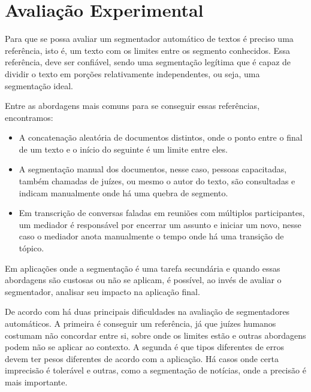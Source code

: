 
\section{Avaliação Experimental}
	\label{sec:avaliacao-experimental}

Para que se possa avaliar um segmentador automático de textos é preciso uma referência, isto é, um texto com os limites entre os segmento conhecidos. Essa referência, deve ser confiável, sendo uma segmentação legítima que é capaz de dividir o texto em porções relativamente independentes, ou seja, uma segmentação ideal.



Entre as abordagens mais comuns para se conseguir essas referências, encontramos: 

\begin{itemize}

\item A concatenação aleatória de documentos distintos, onde o ponto entre o final de um texto e o início do seguinte é um limite entre eles. 

\item A segmentação manual dos documentos, nesse caso, pessoas capacitadas, também chamadas de juízes, ou mesmo o autor do texto, são consultadas e indicam manualmente onde há uma quebra de segmento. 
\item Em transcrição de conversas faladas em reuniões com múltiplos participantes, um mediador é responsável por encerrar um assunto e iniciar um novo, nesse caso o mediador anota manualmente o tempo onde há uma transição de tópico. 

\end{itemize}

Em aplicações onde a segmentação é uma tarefa secundária e quando essas abordagens são custosas ou não se aplicam, é possível, ao invés de avaliar o segmentador, analisar seu impacto na aplicação final.

De acordo com \cite{Pevzner2002} há duas principais dificuldades na avaliação de segmentadores automáticos. A primeira é conseguir um referência, já que juízes humanos costumam não concordar entre si, sobre onde os limites estão e outras abordagens podem não se aplicar ao contexto. A segunda é que tipos diferentes de erros devem ter pesos diferentes de acordo com a aplicação. Há casos onde certa imprecisão é tolerável e outras, como a segmentação de notícias, onde a precisão é mais importante.


